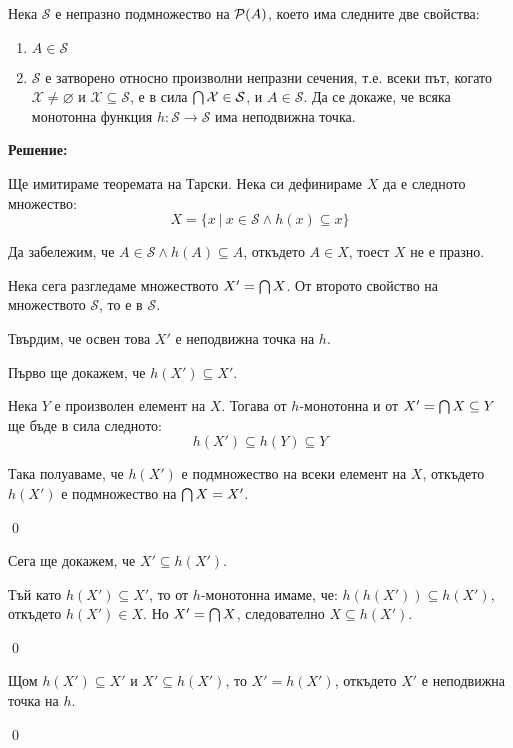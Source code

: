 \begin{problem}
Нека $\mathcal{S}$  е непразно подмножество на $\mathcal{P}(A)$, което има следните две свойства:
\begin{enumerate}
\item
$A \in \mathcal{S}$
\item
$\mathcal{S}$ е затворено относно произволни непразни сечения, т.е. всеки път,
когато $\mathcal{X} \neq \varnothing$ и $\mathcal{X} \subseteq \mathcal{S}$,
е в сила $\bigcap\mathcal{X} \in \mathcal{S}$, и $A \in \mathcal{S}$.
Да се докаже, че всяка монотонна функция $h: \mathcal{S} \to \mathcal{S}$ има неподвижна точка.
\end{enumerate}
\end{problem}

\textbf{Решение:}

\smallbreak
\quad
Ще имитираме теоремата на Тарски. Нека си дефинираме $X$ да е следното множество:
\[
X = \{ x \ |\ x \in \mathcal{S} \land h(x) \subseteq x\}
\]

\quad
Да забележим, че $A \in \mathcal{S} \land h(A) \subseteq A$, откъдето $A \in X$, тоест $X$ не е празно.

\quad
Нека сега разгледаме множеството $X' = \bigcap X$.
От второто свойство на множеството $\mathcal{S}$, то е в $\mathcal{S}$.

\quad
Твърдим, че освен това $X'$ е неподвижна точка на $h$.

\begin{tcolorbox}[mybox={Доказателство:}]
\quad
Първо ще докажем, че $h(X') \subseteq X'$.

\begin{tcolorbox}[mybox={Доказателство:}, colback=green!20, colframe=green!60]
\quad
Нека $Y$ е произволен елемент на $X$. Тогава от $h$-монотонна и от $X' = \bigcap X \subseteq Y$ ще бъде в сила следното:
\[
h(X') \subseteq h(Y) \subseteq Y
\]

\quad
Така полуаваме, че $h(X')$ е подмножество на всеки елемент на $X$,
откъдето $h(X')$ е подмножество на $\bigcap X = X'$.

\qed
\end{tcolorbox}

\quad
Сега ще докажем, че $X' \subseteq h(X')$.

\begin{tcolorbox}[mybox={Доказателство:}, colback=green!20, colframe=green!60]
\quad
Тъй като $h(X') \subseteq X'$, то от $h$-монотонна имаме, че:
$h(h(X')) \subseteq h(X')$, откъдето $h(X') \in X$. Но $X' = \bigcap X$,
следователно $X \subseteq h(X')$.

\qed
\end{tcolorbox}

\quad
Щом $h(X') \subseteq X'$ и $X' \subseteq h(X')$, то $X' = h(X')$, откъдето $X'$ е неподвижна точка на $h$.

\qed
\end{tcolorbox}


